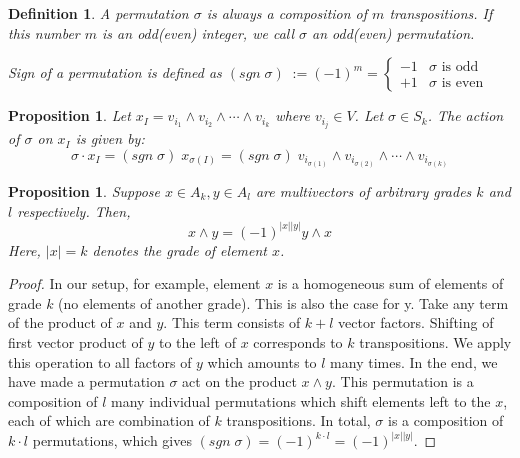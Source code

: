 \documentclass[12pt]{article}
\newtheorem{proposition}[theorem]{Proposition}
\newtheorem{definition}[theorem]{Definition}
\numberwithin{theorem}{section}
\numberwithin{equation}{theorem}
\begin{document}
\begin{definition}
    A permutation $\sigma$ is always a composition of $m$ transpositions. If this number $m$ is an odd(even) integer, we call $\sigma$ an odd(even) permutation. 

    Sign of a permutation is defined as $(sgn \;\sigma) \; := (-1)^m = \begin{cases}
        -1 & \sigma \text{ is odd}\\
        +1 & \sigma \text{ is even} 
    \end{cases}$
\end{definition}

\begin{proposition}
    Let $x_I = v_{i_1} \wedge v_{i_2} \wedge \cdots \wedge v_{i_k}$ where $v_{i_j} \in V$. Let $\sigma \in S_k$. The action of $\sigma$ on $x_I$ is given by:
    $$\sigma \cdot x_I = (sgn\;\sigma)\;x_{\sigma(I)} = (sgn\;\sigma)\; v_{i_{\sigma(1)}} \wedge v_{i_{\sigma(2)}} \wedge \cdots \wedge v_{i_{\sigma(k)}}$$
\end{proposition}

\begin{proposition}\label{prop:parity}
    Suppose $x \in A_k, y \in A_l$ are multivectors of arbitrary grades $k$ and $l$ respectively. Then, $$x \wedge y = (-1)^{|x||y|}y \wedge x$$
    Here, $|x| = k$ denotes the grade of element $x$.
\end{proposition}
\begin{proof}
    In our setup, for example, element $x$ is a homogeneous sum of elements of grade $k$ (no elements of another grade). This is also the case for y. Take any term of the product of $x$ and $y$. This term consists of $k+l$ vector factors. Shifting of first vector product of $y$ to the left of $x$ corresponds to $k$ transpositions. We apply this operation to all factors of $y$ which amounts to $l$ many times. In the end, we have made a permutation $\sigma$ act on the product $x \wedge y$. This permutation is a composition of $l$ many individual permutations which shift elements left to the $x$, each of which are combination of $k$ transpositions. In total, $\sigma$ is a composition of $k \cdot l$ permutations, which gives $(sgn \;\sigma) = (-1)^{k \cdot l} = (-1)^{|x||y|}$.
\end{proof}
\end{document}
